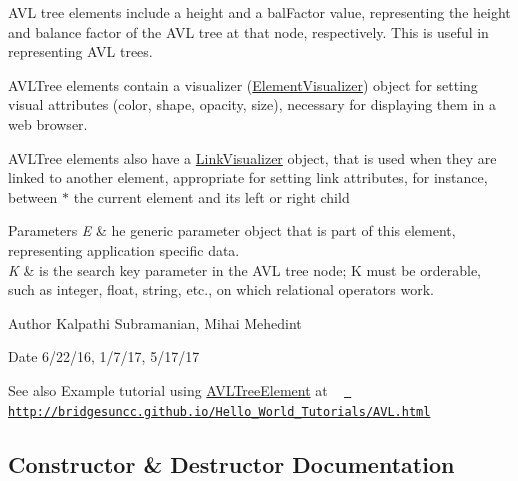 A\+VL tree elements include a \textquotesingle{}height\textquotesingle{} and a \textquotesingle{}bal\+Factor\textquotesingle{} value, representing the height and balance factor of the A\+VL tree at that node, respectively. This is useful in representing A\+VL trees.

A\+V\+L\+Tree elements contain a visualizer (\mbox{\hyperlink{classbridges_1_1base_1_1_element_visualizer}{Element\+Visualizer}}) object for setting visual attributes (color, shape, opacity, size), necessary for displaying them in a web browser.

A\+V\+L\+Tree elements also have a \mbox{\hyperlink{classbridges_1_1base_1_1_link_visualizer}{Link\+Visualizer}} object, that is used when they are linked to another element, appropriate for setting link attributes, for instance, between $\ast$ the current element and its left or right child


\begin{DoxyParams}{Parameters}
{\em E} & he generic parameter object that is part of this element, representing application specific data. \\
\hline
{\em K} & is the search key parameter in the A\+VL tree node; K must be orderable, such as integer, float, string, etc., on which relational operators work.\\
\hline
\end{DoxyParams}
\begin{DoxyAuthor}{Author}
Kalpathi Subramanian, Mihai Mehedint
\end{DoxyAuthor}
\begin{DoxyDate}{Date}
6/22/16, 1/7/17, 5/17/17
\end{DoxyDate}
\begin{DoxySeeAlso}{See also}
Example tutorial using \mbox{\hyperlink{classbridges_1_1base_1_1_a_v_l_tree_element}{A\+V\+L\+Tree\+Element}} at ~\newline
 \href{http://bridgesuncc.github.io/Hello_World_Tutorials/AVL.html}{\texttt{ http\+://bridgesuncc.\+github.\+io/\+Hello\+\_\+\+World\+\_\+\+Tutorials/\+A\+V\+L.\+html}} 
\end{DoxySeeAlso}


\subsection{Constructor \& Destructor Documentation}
\mbox{\label{classbridges_1_1base_1_1_a_v_l_tree_element_a8fe4490d3d5d16991736bd1a7243b904}} 
